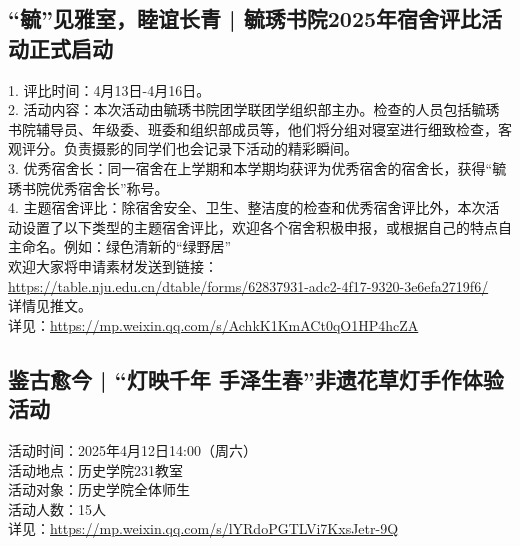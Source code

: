 \documentclass[letterpaper, 12pt]{article}
\begin{document}
\begin{multicols}{2}
\subsection{“毓”见雅室，睦谊长青 | 毓琇书院2025年宿舍评比活动正式启动}
1. 评比时间：4月13日-4月16日。
\\2. 活动内容：本次活动由毓琇书院团学联团学组织部主办。检查的人员包括毓琇书院辅导员、年级委、班委和组织部成员等，他们将分组对寝室进行细致检查，客观评分。负责摄影的同学们也会记录下活动的精彩瞬间。
\\3. 优秀宿舍长：同一宿舍在上学期和本学期均获评为优秀宿舍的宿舍长，获得“毓琇书院优秀宿舍长”称号。
\\4. 主题宿舍评比：除宿舍安全、卫生、整洁度的检查和优秀宿舍评比外，本次活动设置了以下类型的主题宿舍评比，欢迎各个宿舍积极申报，或根据自己的特点自主命名。例如：绿色清新的“绿野居”
\\欢迎大家将申请素材发送到链接：\url{https://table.nju.edu.cn/dtable/forms/62837931-adc2-4f17-9320-3e6efa2719f6/}
\\详情见推文。
\\详见：\url{https://mp.weixin.qq.com/s/AchkK1KmACt0qO1HP4hcZA}

\subsection{鉴古愈今 | “灯映千年 手泽生春”非遗花草灯手作体验活动}
活动时间：2025年4月12日14:00（周六）
\\活动地点：历史学院231教室
\\活动对象：历史学院全体师生
\\活动人数：15人
\\详见：\url{https://mp.weixin.qq.com/s/lYRdoPGTLVi7KxsJetr-9Q}


\end{multicols}
\end{document}
